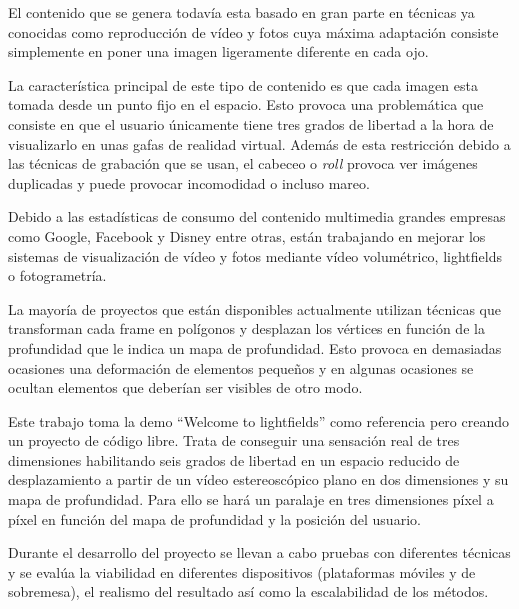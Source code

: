 El contenido que se genera todavía esta basado en gran parte en técnicas ya conocidas como reproducción de vídeo y fotos cuya máxima adaptación consiste simplemente en poner una imagen ligeramente diferente en cada ojo.

La característica principal de este tipo de contenido es que cada imagen esta tomada desde un punto fijo en el espacio. Esto provoca una problemática que consiste en que el usuario únicamente tiene tres grados de libertad a la hora de visualizarlo en unas gafas de realidad virtual. Además de esta restricción debido a las técnicas de grabación que se usan, el cabeceo o \textit{roll} provoca ver imágenes duplicadas y puede provocar incomodidad o incluso mareo.

Debido a las estadísticas de consumo del contenido multimedia grandes empresas como Google, Facebook y Disney entre otras, están trabajando en mejorar los sistemas de visualización de vídeo y fotos mediante vídeo volumétrico, lightfields o fotogrametría.

La mayoría de proyectos que están disponibles actualmente utilizan técnicas que transforman cada frame en polígonos y desplazan los vértices en función de la profundidad que le indica un mapa de profundidad. Esto provoca en demasiadas ocasiones una deformación de elementos pequeños y en algunas ocasiones se ocultan elementos que deberían ser visibles de otro modo.

Este trabajo toma la demo ``Welcome to lightfields'' como referencia pero creando un proyecto de código libre. Trata de conseguir una sensación real de tres dimensiones habilitando seis grados de libertad en un espacio reducido de desplazamiento a partir de un vídeo estereoscópico plano en dos dimensiones y su mapa de profundidad. Para ello se hará un paralaje en tres dimensiones píxel a píxel en función del mapa de profundidad y la posición del usuario.

Durante el desarrollo del proyecto se llevan a cabo pruebas con diferentes técnicas y se evalúa la viabilidad en diferentes dispositivos (plataformas móviles y de sobremesa), el realismo del resultado así como la escalabilidad de los métodos.

















